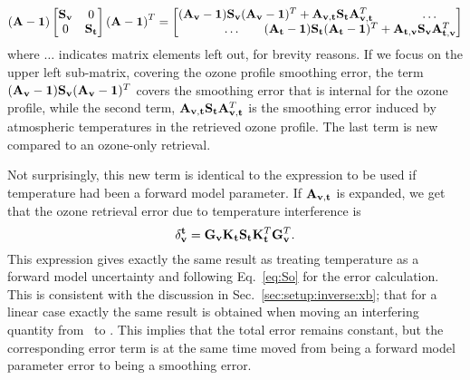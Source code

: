 \begin{displaymath}
  \left(\AvrKrnMtr-\IdnMtr\right)
  \begin{bmatrix}
    \aCvrMtr{\VctStl{v}} & 0 \\
    0 & \aCvrMtr{\VctStl{t}} 
  \end{bmatrix} 
  \left(\AvrKrnMtr-\IdnMtr\right)^T =
  \begin{bmatrix}
    (\AvrKrnMtr_{\VctStl{v}}-\IdnMtr)\aCvrMtr{\VctStl{v}}
    (\AvrKrnMtr_{\VctStl{v}}-\IdnMtr)^T + 
    \AvrKrnMtr_{\VctStl{v},\VctStl{t}}\aCvrMtr{\VctStl{t}}\AvrKrnMtr_{\VctStl{v},\VctStl{t}}^T
    & \hspace{5mm}\dots \\
    \hspace{-25mm}\dots & \hspace{-35mm}%
    (\AvrKrnMtr_{\VctStl{t}}-\IdnMtr)\aCvrMtr{\VctStl{t}}
    (\AvrKrnMtr_{\VctStl{t}}-\IdnMtr)^T + 
    \AvrKrnMtr_{\VctStl{t},\VctStl{v}}\aCvrMtr{\VctStl{v}}\AvrKrnMtr_{\VctStl{t},\VctStl{v}}^T
  \end{bmatrix} 
\end{displaymath}
where $\dots$ indicates matrix elements left out, for brevity reasons. If we
focus on the upper left sub-matrix, covering the ozone profile smoothing error,
the term $(\mathbf{A}_{\mathbf{v}}-\mathbf{1})\mathbf{S}_{\mathbf{v}}
(\mathbf{A}_{\mathbf{v}}-\mathbf{1})^T$ covers the smoothing error that is
internal for the ozone profile, while the second term,
$\mathbf{A}_{\mathbf{v},\mathbf{t}}\mathbf{S}_{\mathbf{t}}\mathbf{A}_{\mathbf{v},\mathbf{t}}^T$
is the smoothing error induced by atmospheric temperatures in the retrieved
ozone profile. The last term is new compared to an ozone-only retrieval.

Not surprisingly, this new term is identical to the expression to be used if
temperature had been a forward model parameter. If
$\mathbf{A}_{\mathbf{v},\mathbf{t}}$ is expanded, we get that the ozone retrieval
error due to temperature interference is
\begin{displaymath}
  \delta_{\mathbf{v}}^{\mathbf{t}} =
  \mathbf{G}_{\mathbf{v}}\mathbf{K}_{\mathbf{t}}\mathbf{S}_{\mathbf{t}}
   \mathbf{K}_{\mathbf{t}}^T\mathbf{G}_{\mathbf{v}}^T.
\end{displaymath}
This expression gives exactly the same result as treating temperature as a
forward model uncertainty and following Eq.~\ref{eq:So} for the error
calculation. This is consistent with the discussion in
Sec.~\ref{sec:setup:inverse:xb}; that for a linear case exactly the same result
is obtained when moving an interfering quantity from \FrwMdlVct\ to \SttVct.
This implies that the total error remains constant, but the corresponding error
term is at the same time moved from being a forward model parameter error to
being a smoothing error. 


